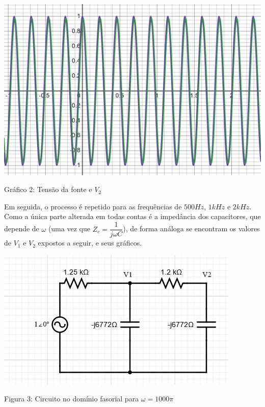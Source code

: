 \documentclass[a4 paper]{article}
\begin{document}
\begin{table}[h]
\centering
\includegraphics[scale=0.225]{rgadicoas/grafico5}
\end{table}

\begin{center}
Gráfico 2: Tensão da fonte e $V_2$
\end{center}

Em seguida, o processo é repetido para as frequências de $500Hz$, $1kHz$ e $2kHz$. Como a única parte alterada em todas contas é a impedância dos capacitores, que depende de $\omega$ (uma vez que $Z_c=\dfrac{1}{j\omega C}$), de forma análoga se encontram  os valores de $V_1$ e $V_2$ expostos a seguir, e seus gráficos.

\begin{table}[h]
\centering
\includegraphics[scale=0.6]{figuras/figura3}
\end{table}

\begin{center}
Figura 3: Circuito no domínio fasorial para $\omega=1000\pi$
\end{center}
\end{document}
